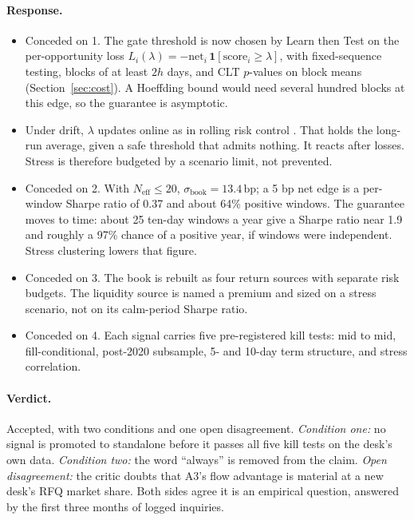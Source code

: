 \documentclass[11pt,letterpaper]{article}
\newcommand{\ind}[1]{\mathbf{1}\!\left[#1\right]}
\newcommand{\bp}{\,\mathrm{bp}}
\newcommand{\Neff}{N_{\mathrm{eff}}}
\begin{document}
\paragraph{Response.}
\begin{itemize}[itemsep=2pt,topsep=2pt]
\item Conceded on 1. The gate threshold is now chosen by Learn then Test \cite{ltt} on the per-opportunity loss $L_i(\lambda)=-\mathrm{net}_i\,\ind{\mathrm{score}_i\ge\lambda}$, with fixed-sequence testing, blocks of at least $2h$ days, and CLT $p$-values on block means (Section~\ref{sec:cost}). A Hoeffding bound would need several hundred blocks at this edge, so the guarantee is asymptotic.
\item Under drift, $\lambda$ updates online as in rolling risk control \cite{frbr}. That holds the long-run average, given a safe threshold that admits nothing. It reacts after losses. Stress is therefore budgeted by a scenario limit, not prevented.
\item Conceded on 2. With $\Neff\le20$, $\sigma_{\mathrm{book}}=13.4\bp$; a 5 bp net edge is a per-window Sharpe ratio of 0.37 and about 64\% positive windows. The guarantee moves to time: about 25 ten-day windows a year give a Sharpe ratio near 1.9 and roughly a 97\% chance of a positive year, if windows were independent. Stress clustering lowers that figure.
\item Conceded on 3. The book is rebuilt as four return sources with separate risk budgets. The liquidity source is named a premium and sized on a stress scenario, not on its calm-period Sharpe ratio.
\item Conceded on 4. Each signal carries five pre-registered kill tests: mid to mid, fill-conditional, post-2020 subsample, 5- and 10-day term structure, and stress correlation.
\end{itemize}

\paragraph{Verdict.} Accepted, with two conditions and one open disagreement. \emph{Condition one:} no signal is promoted to standalone before it passes all five kill tests on the desk's own data. \emph{Condition two:} the word ``always'' is removed from the claim. \emph{Open disagreement:} the critic doubts that A3's flow advantage is material at a new desk's RFQ market share. Both sides agree it is an empirical question, answered by the first three months of logged inquiries.
\end{document}
